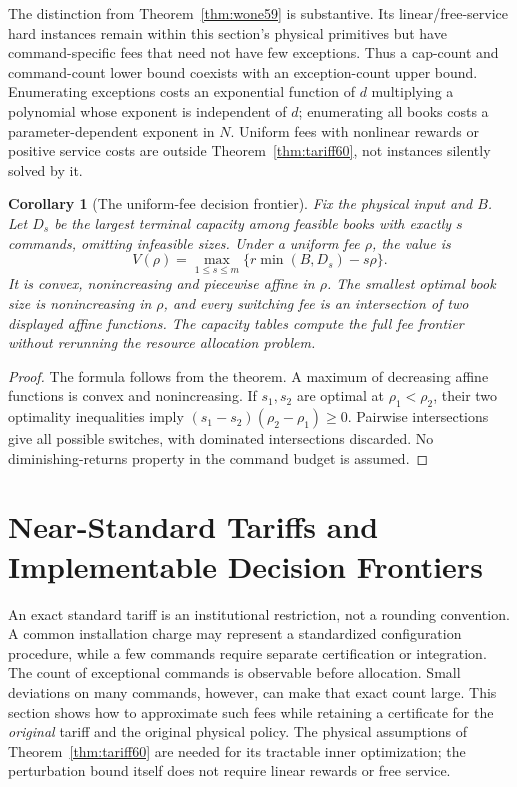 \documentclass[11pt,letterpaper]{article}
\newtheorem{corollary}[theorem]{Corollary}
\theoremstyle{definition}\newtheorem{remark}[theorem]{Remark}
\begin{document}
The distinction from Theorem~\ref{thm:wone59} is substantive. Its linear/free-service hard instances remain within this section's physical primitives but have command-specific fees that need not have few exceptions. Thus a cap-count and command-count lower bound coexists with an exception-count upper bound. Enumerating exceptions costs an exponential function of $d$ multiplying a polynomial whose exponent is independent of $d$; enumerating all books costs a parameter-dependent exponent in $N$. Uniform fees with nonlinear rewards or positive service costs are outside Theorem~\ref{thm:tariff60}, not instances silently solved by it.

\begin{corollary}[The uniform-fee decision frontier]\label{cor:fee60}
Fix the physical input and $B$. Let $D_s$ be the largest terminal capacity among feasible books with exactly $s$ commands, omitting infeasible sizes. Under a uniform fee $\rho$, the value is
\[
 V(\rho)=\max_{1\leq s\leq m}\{r\min(B,D_s)-s\rho\}.
\]
It is convex, nonincreasing and piecewise affine in $\rho$. The smallest optimal book size is nonincreasing in $\rho$, and every switching fee is an intersection of two displayed affine functions. The capacity tables compute the full fee frontier without rerunning the resource allocation problem.
\end{corollary}
\begin{proof}
The formula follows from the theorem. A maximum of decreasing affine functions is convex and nonincreasing. If $s_1,s_2$ are optimal at $\rho_1<\rho_2$, their two optimality inequalities imply $(s_1-s_2)(\rho_2-\rho_1)\geq0$. Pairwise intersections give all possible switches, with dominated intersections discarded. No diminishing-returns property in the command budget is assumed.
\end{proof}
\section{Near-Standard Tariffs and Implementable Decision Frontiers}\label{sec:robust63}
An exact standard tariff is an institutional restriction, not a rounding convention. A common installation charge may represent a standardized configuration procedure, while a few commands require separate certification or integration. The count of exceptional commands is observable before allocation. Small deviations on many commands, however, can make that exact count large. This section shows how to approximate such fees while retaining a certificate for the \emph{original} tariff and the original physical policy. The physical assumptions of Theorem~\ref{thm:tariff60} are needed for its tractable inner optimization; the perturbation bound itself does not require linear rewards or free service.
\end{document}
